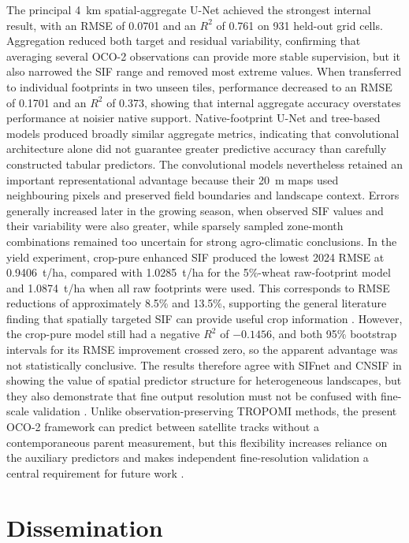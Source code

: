 The principal 4~km spatial-aggregate U-Net achieved the strongest internal result, with an RMSE of 0.0701 and an $R^2$ of 0.761 on 931 held-out grid cells. Aggregation reduced both target and residual variability, confirming that averaging several OCO-2 observations can provide more stable supervision, but it also narrowed the SIF range and removed most extreme values. When transferred to individual footprints in two unseen tiles, performance decreased to an RMSE of 0.1701 and an $R^2$ of 0.373, showing that internal aggregate accuracy overstates performance at noisier native support. Native-footprint U-Net and tree-based models produced broadly similar aggregate metrics, indicating that convolutional architecture alone did not guarantee greater predictive accuracy than carefully constructed tabular predictors. The convolutional models nevertheless retained an important representational advantage because their 20~m maps used neighbouring pixels and preserved field boundaries and landscape context. Errors generally increased later in the growing season, when observed SIF values and their variability were also greater, while sparsely sampled zone-month combinations remained too uncertain for strong agro-climatic conclusions. In the yield experiment, crop-pure enhanced SIF produced the lowest 2024 RMSE at 0.9406~t/ha, compared with 1.0285~t/ha for the 5\%-wheat raw-footprint model and 1.0874~t/ha when all raw footprints were used. This corresponds to RMSE reductions of approximately 8.5\% and 13.5\%, supporting the general literature finding that spatially targeted SIF can provide useful crop information \cite{peng2020assessing,song2018satellite,qiu2022monitoring}. However, the crop-pure model still had a negative $R^2$ of $-0.1456$, and both 95\% bootstrap intervals for its RMSE improvement crossed zero, so the apparent advantage was not statistically conclusive. The results therefore agree with SIFnet and CNSIF in showing the value of spatial predictor structure for heterogeneous landscapes, but they also demonstrate that fine output resolution must not be confused with fine-scale validation \cite{gensheimer2022convolutional,du2025cnsif}. Unlike observation-preserving TROPOMI methods, the present OCO-2 framework can predict between satellite tracks without a contemporaneous parent measurement, but this flexibility increases reliance on the auxiliary predictors and makes independent fine-resolution validation a central requirement for future work \cite{chen2025improved,zhang2023generating}.

\section{Dissemination\label{sec:dissemination}}

